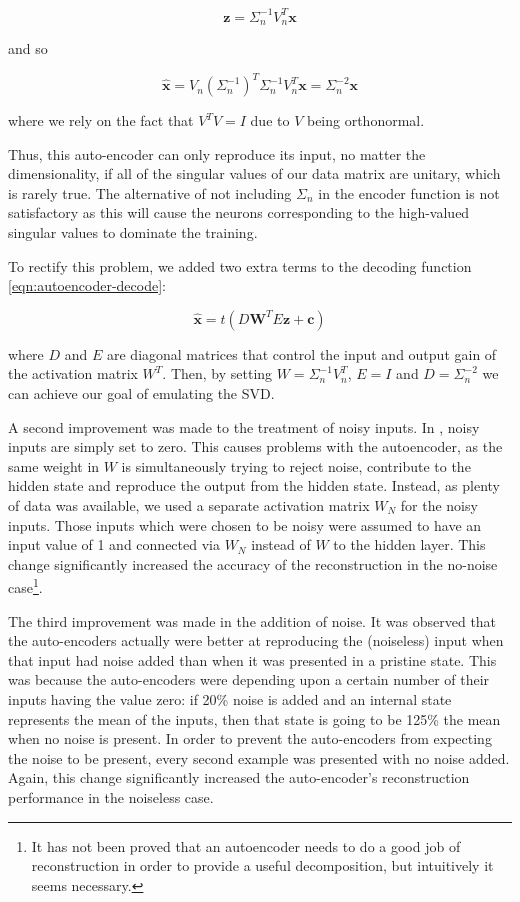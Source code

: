 \documentclass{article}
\begin{document}
\begin{equation}
\mathbf{z} = \Sigma_n^{-1} V_n^T \mathbf{x}
\end{equation}

and so

\begin{equation}
\hat{\mathbf{x}} = V_n \left( \Sigma_n^{-1} \right)^T \Sigma_n^{-1} V_n^T \mathbf{x} = \Sigma_n^{-2} \mathbf{x}
\end{equation}

where we rely on the fact that $V^T V = I$ due to $V$ being orthonormal.

Thus, this auto-encoder can only reproduce its input, no matter the dimensionality, if all of the singular values of our data matrix are unitary, which is rarely true.  The alternative of not including $\Sigma_n$ in the encoder function is not satisfactory as this will cause the neurons corresponding to the high-valued singular values to dominate the training.

To rectify this problem, we added two extra terms to the decoding function \ref{eqn:autoencoder-decode}:

\begin{equation}
\label{eqn:autoencoder-decode-improved}
\hat{\mathbf{x}} = t(D \mathbf{W}^T E \mathbf{z} + \mathbf{c})
\end{equation}

where $D$ and $E$ are diagonal matrices that control the input and output gain of the activation matrix $W^T$.  Then, by setting $W = \Sigma_n^{-1} V_n^T$, $E = I$ and $D = \Sigma_n^{-2}$ we can achieve our goal of emulating the SVD.

A second improvement was made to the treatment of noisy inputs.  In \cite{Vincent-TR1316}, noisy inputs are simply set to zero.  This causes problems with the autoencoder, as the same weight in $W$ is simultaneously trying to reject noise, contribute to the hidden state and reproduce the output from the hidden state.  Instead, as plenty of data was available, we used a separate activation matrix $W_N$ for the noisy inputs.  Those inputs which were chosen to be noisy were assumed to have an input value of 1 and connected via $W_N$ instead of $W$ to the hidden layer.  This change significantly increased the accuracy of the reconstruction in the no-noise case\footnote{It has not been proved that an autoencoder needs to do a good job of reconstruction in order to provide a useful decomposition, but intuitively it seems necessary.}.

The third improvement was made in the addition of noise.  It was observed that the auto-encoders actually were better at reproducing the (noiseless) input when that input had noise added than when it was presented in a pristine state.
This was because the auto-encoders were depending upon a certain number of their inputs having the value zero: if 20\% noise is added and an internal state represents the mean of the inputs, then that state is going to be 125\% the mean when no noise is present.
In order to prevent the auto-encoders from expecting the noise to be present, every second example was presented with no noise added.  Again, this change significantly increased the auto-encoder's reconstruction performance in the noiseless case.
\end{document}
